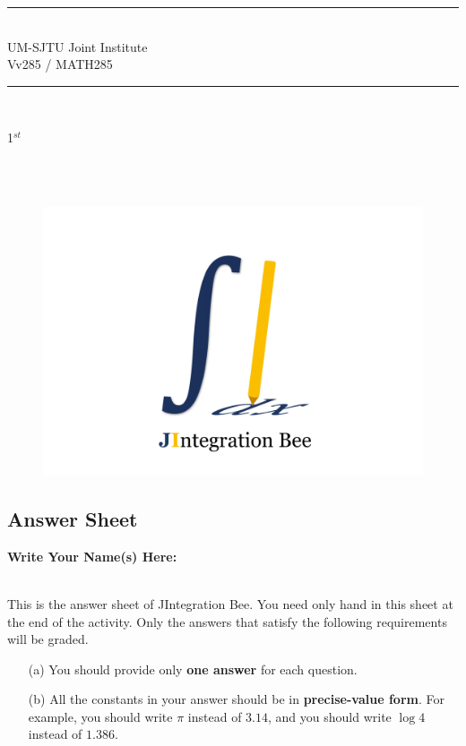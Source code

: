 \documentclass[12pt]{article}
\begin{document}
    \vspace{10cm}
    \begin{center}
        \rule{15cm}{0.01cm}
        \\\LARGE{
            UM-SJTU Joint Institute
            \\Vv285 / MATH285
          }
        \\\rule{15cm}{0.01cm}
        \\\vspace{6cm}
         \begin{Huge}
            1$^{st}$
        \end{Huge}
        \begin{Huge}
            \\
            \\
        \end{Huge}
    \end{center}
    \begin{figure}[H]
        \center
        \includegraphics[width = 0.8\linewidth]{Figure/Logo.png}
    \end{figure}
    \vfill
    \flushleft
    \begin{center}
    \end{center}

\setlength{\parindent}{1em}
\newpage
\thispagestyle{empty}
\setcounter{page}{1}

\begin{center}
    \section*{Answer Sheet}
\end{center}
\textbf{Write Your Name(s) Here: }
\\~
\par This is the answer sheet of JIntegration Bee. You need only hand in this sheet at the end of the activity. Only the answers that satisfy the following requirements will be graded. 
\begin{itemize}
    \item [(a)] You should provide only \textbf{one answer} for each question. 
    \item [(b)] All the constants in your answer should be in \textbf{precise-value form}. For example, you should write $\pi$ instead of $3.14$, and you should write $ \log 4$ instead of $1.386$. 

\end{itemize} 
\end{document}
